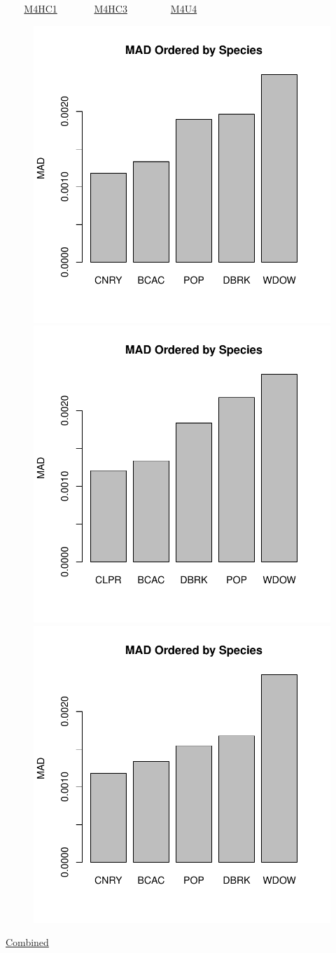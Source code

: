 \documentclass[ xcolor = pdftex, dvipsnames, table ]{beamer}
\begin{document}
%
\begin{frame}{$~~~~~~~$ \href{https://github.com/gasduster99/sppComp/tree/master/sscRuns/26919781982M4HC1}{M4HC1} $~~~~~~~~~~~~~~$ \href{https://github.com/gasduster99/sppComp/tree/master/sscRuns/26919781982M4HC3}{M4HC3} $~~~~~~~~~~~~~~~~~$ \href{https://github.com/gasduster99/sppComp/tree/master/sscRuns/26919781982M4U4}{M4U4} }
        \begin{figure}[ht!]
        \centering
        \hspace*{-1cm}
        \includegraphics[width=.4\textwidth]{../sscRuns/26919781982M4HC1/sppTailMad68.pdf}
        \includegraphics[width=.4\textwidth]{../sscRuns/26919781982M4HC3/sppTailMad68.pdf}
        \includegraphics[width=.4\textwidth]{../sscRuns/26919781982M4U4/sppTailMad68.pdf}
        \end{figure}
	\vspace{-1cm}
	\begin{center}
	\Large
	\href{https://github.com/gasduster99/sppComp/tree/master/try1/postSSC/26919781982M4HC1HC3U4}{Combined}
	\end{center}
\end{frame}
\end{document}
